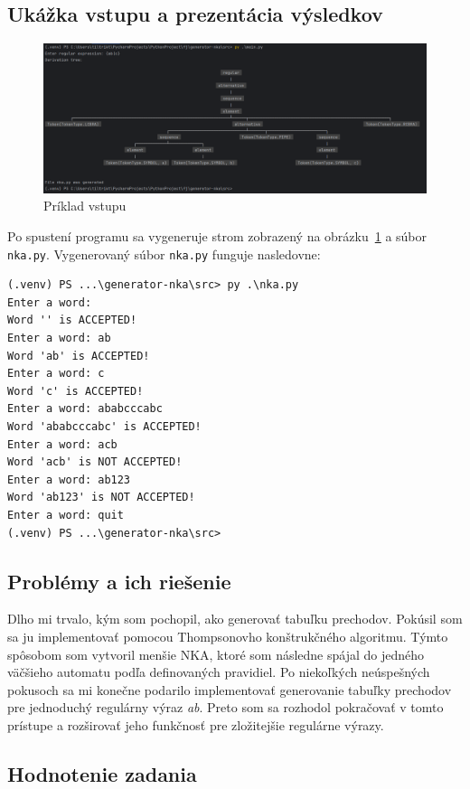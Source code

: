 \documentclass[a4paper,12pt]{article}
\begin{document}
\subsection{Ukážka vstupu a prezentácia výsledkov}

\begin{figure}
    \centering
    \includegraphics[width=1\textwidth]{figs/tree-example}
    \caption{Príklad vstupu}
    \label{fig:tree-example}
\end{figure}
Po spustení programu sa vygeneruje strom zobrazený na obrázku~\ref{fig:tree-example} a súbor \texttt{nka.py}.
Vygenerovaný súbor \texttt{nka.py} funguje nasledovne:
\lstset{basicstyle=\ttfamily}
\begin{lstlisting}
(.venv) PS ...\generator-nka\src> py .\nka.py
Enter a word:
Word '' is ACCEPTED!
Enter a word: ab
Word 'ab' is ACCEPTED!
Enter a word: c
Word 'c' is ACCEPTED!
Enter a word: ababcccabc
Word 'ababcccabc' is ACCEPTED!
Enter a word: acb
Word 'acb' is NOT ACCEPTED!
Enter a word: ab123
Word 'ab123' is NOT ACCEPTED!
Enter a word: quit
(.venv) PS ...\generator-nka\src>
\end{lstlisting}


\subsection{Problémy a ich riešenie}

Dlho mi trvalo, kým som pochopil, ako generovať tabuľku prechodov. Pokúsil som sa ju implementovať pomocou Thompsonovho konštrukčného algoritmu.
Týmto spôsobom som vytvoril menšie NKA, ktoré som následne spájal do jedného väčšieho automatu podľa definovaných pravidiel.
Po niekoľkých neúspešných pokusoch sa mi konečne podarilo implementovať generovanie tabuľky prechodov pre jednoduchý regulárny výraz \textit{ab}.
Preto som sa rozhodol pokračovať v tomto prístupe a rozširovať jeho funkčnosť pre zložitejšie regulárne výrazy.

\subsection{Hodnotenie zadania}
\end{document}
